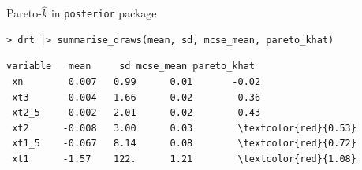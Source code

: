 \documentclass[english,t]{beamer}
\begin{document}
\begin{frame}[fragile]{Pareto-$\hat{k}$ in \texttt{posterior} package}

  {\color{gray}
\begin{verbatim}
> drt |> summarise_draws(mean, sd, mcse_mean, pareto_khat)
\end{verbatim}
    }
\begin{Verbatim}[commandchars=\\\{\}]
 variable   mean     sd mcse_mean pareto_khat
 xn        0.007   0.99      0.01       -0.02
 xt3       0.004   1.66      0.02        0.36
 xt2_5     0.002   2.01      0.02        0.43
 xt2      -0.008   3.00      0.03        \textcolor{red}{0.53}
 xt1_5    -0.067   8.14      0.08        \textcolor{red}{0.72}
 xt1      -1.57    122.      1.21        \textcolor{red}{1.08}  
\end{Verbatim}

\end{frame}





\end{document}
